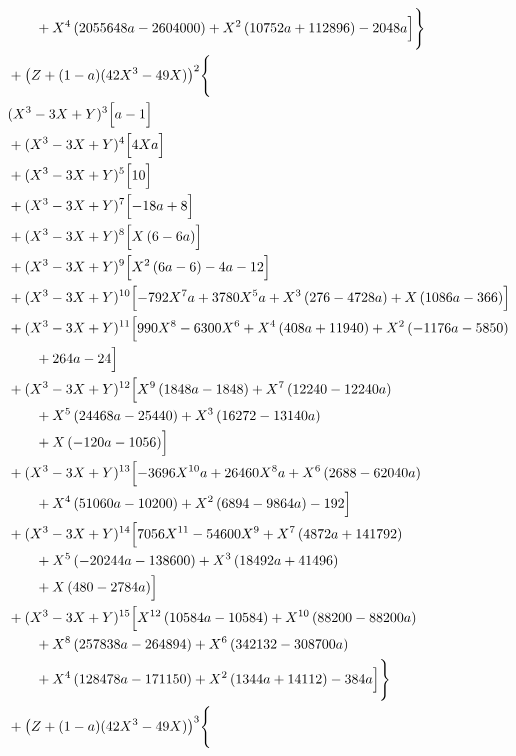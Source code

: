 \begin{align*}
&\qquad + X^{4} \left(2055648 a - 2604000\right) + X^{2} \left(10752 a + 112896\right) - 2048 a\Bigr]\Biggr\}\\
&{}+\bigl(Z+(1-a)(42X^3-49X)\bigr)^{2}\Biggl\{\\
&{}(X^3-3X+Y)^{3}\Bigl[a - 1\Bigr]\\
&{}+(X^3-3X+Y)^{4}\Bigl[4 X a\Bigr]\\
&{}+(X^3-3X+Y)^{5}\Bigl[10\Bigr]\\
&{}+(X^3-3X+Y)^{7}\Bigl[- 18 a + 8\Bigr]\\
&{}+(X^3-3X+Y)^{8}\Bigl[X \left(6 - 6 a\right)\Bigr]\\
&{}+(X^3-3X+Y)^{9}\Bigl[X^{2} \left(6 a - 6\right) - 4 a - 12\Bigr]\\
&{}+(X^3-3X+Y)^{10}\Bigl[- 792 X^{7} a + 3780 X^{5} a + X^{3} \left(276 - 4728 a\right) + X \left(1086 a - 366\right)\Bigr]\\
&{}+(X^3-3X+Y)^{11}\Bigl[990 X^{8} - 6300 X^{6} + X^{4} \left(408 a + 11940\right) + X^{2} \left(- 1176 a - 5850\right)\\
&\qquad + 264 a - 24\Bigr]\\
&{}+(X^3-3X+Y)^{12}\Bigl[X^{9} \left(1848 a - 1848\right) + X^{7} \left(12240 - 12240 a\right)\\
&\qquad + X^{5} \left(24468 a - 25440\right) + X^{3} \left(16272 - 13140 a\right)\\
&\qquad + X \left(- 120 a - 1056\right)\Bigr]\\
&{}+(X^3-3X+Y)^{13}\Bigl[- 3696 X^{10} a + 26460 X^{8} a + X^{6} \left(2688 - 62040 a\right)\\
&\qquad + X^{4} \left(51060 a - 10200\right) + X^{2} \left(6894 - 9864 a\right) - 192\Bigr]\\
&{}+(X^3-3X+Y)^{14}\Bigl[7056 X^{11} - 54600 X^{9} + X^{7} \left(4872 a + 141792\right)\\
&\qquad + X^{5} \left(- 20244 a - 138600\right) + X^{3} \left(18492 a + 41496\right)\\
&\qquad + X \left(480 - 2784 a\right)\Bigr]\\
&{}+(X^3-3X+Y)^{15}\Bigl[X^{12} \left(10584 a - 10584\right) + X^{10} \left(88200 - 88200 a\right)\\
&\qquad + X^{8} \left(257838 a - 264894\right) + X^{6} \left(342132 - 308700 a\right)\\
&\qquad + X^{4} \left(128478 a - 171150\right) + X^{2} \left(1344 a + 14112\right) - 384 a\Bigr]\Biggr\}\\
&{}+\bigl(Z+(1-a)(42X^3-49X)\bigr)^{3}\Biggl\{\\

\end{align*}
